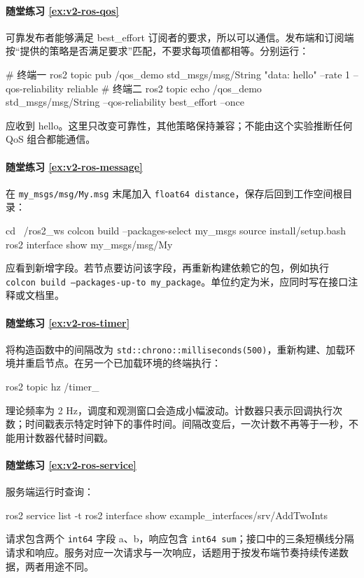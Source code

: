\paragraph*{随堂练习 \ref{ex:v2-ros-qos}}
\begin{solution}
可靠发布者能够满足 best\_effort 订阅者的要求，所以可以通信。发布端和订阅端按“提供的策略是否满足要求”匹配，不要求每项值都相等。分别运行：
\begin{tbash}
# 终端一
ros2 topic pub /qos_demo std_msgs/msg/String "{data: hello}" --rate 1 --qos-reliability reliable
# 终端二
ros2 topic echo /qos_demo std_msgs/msg/String --qos-reliability best_effort --once
\end{tbash}
应收到 hello。这里只改变可靠性，其他策略保持兼容；不能由这个实验推断任何 QoS 组合都能通信。
\end{solution}

\paragraph*{随堂练习 \ref{ex:v2-ros-message}}
\begin{solution}
在 \texttt{my\_msgs/msg/My.msg} 末尾加入 \texttt{float64 distance}，保存后回到工作空间根目录：
\begin{tbash}
cd ~/ros2_ws
colcon build --packages-select my_msgs
source install/setup.bash
ros2 interface show my_msgs/msg/My
\end{tbash}
应看到新增字段。若节点要访问该字段，再重新构建依赖它的包，例如执行 \texttt{colcon build --packages-up-to my\_package}。单位约定为米，应同时写在接口注释或文档里。
\end{solution}

\paragraph*{随堂练习 \ref{ex:v2-ros-timer}}
\begin{solution}
将构造函数中的间隔改为 \texttt{std::chrono::milliseconds(500)}，重新构建、加载环境并重启节点。在另一个已加载环境的终端执行：
\begin{tbash}
ros2 topic hz /timer_
\end{tbash}
理论频率为 2 Hz，调度和观测窗口会造成小幅波动。计数器只表示回调执行次数；时间戳表示特定时钟下的事件时间。间隔改变后，一次计数不再等于一秒，不能用计数器代替时间戳。
\end{solution}

\paragraph*{随堂练习 \ref{ex:v2-ros-service}}
\begin{solution}
服务端运行时查询：
\begin{tbash}
ros2 service list -t
ros2 interface show example_interfaces/srv/AddTwoInts
\end{tbash}
请求包含两个 \texttt{int64} 字段 a、b，响应包含 \texttt{int64 sum}；接口中的三条短横线分隔请求和响应。服务对应一次请求与一次响应，话题用于按发布端节奏持续传递数据，两者用途不同。
\end{solution}


